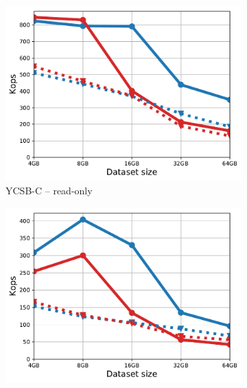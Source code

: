 \begin{figure}[tb]
\begin{subfigure}{0.3\linewidth}
\includegraphics[width=\textwidth]{figs/Workload_C_line.pdf}
\caption{YCSB-C -- read-only}
\label{fig:throughput:c}
\end{subfigure}
\begin{subfigure}{0.3\linewidth}
\includegraphics[width=\textwidth]{figs/Workload_E-_line.pdf}

\end{subfigure}
\end{figure}
